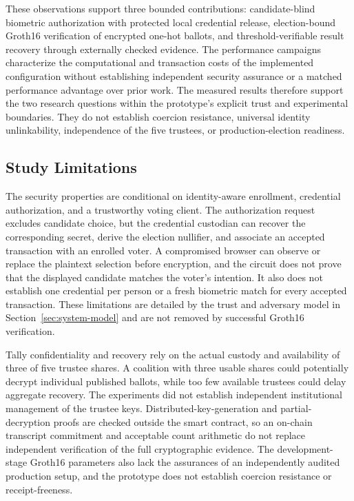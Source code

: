These observations support three bounded contributions: candidate-blind biometric authorization with protected local credential release, election-bound Groth16 verification of encrypted one-hot ballots, and threshold-verifiable result recovery through externally checked evidence. The performance campaigns characterize the computational and transaction costs of the implemented configuration without establishing independent security assurance or a matched performance advantage over prior work. The measured results therefore support the two research questions within the prototype's explicit trust and experimental boundaries. They do not establish coercion resistance, universal identity unlinkability, independence of the five trustees, or production-election readiness.

\subsection{Study Limitations}
\label{sec:09}
\label{sec:limitations}

The security properties are conditional on identity-aware enrollment, credential authorization, and a trustworthy voting client. The authorization request excludes candidate choice, but the credential custodian can recover the corresponding secret, derive the election nullifier, and associate an accepted transaction with an enrolled voter. A compromised browser can observe or replace the plaintext selection before encryption, and the circuit does not prove that the displayed candidate matches the voter's intention. It also does not establish one credential per person or a fresh biometric match for every accepted transaction. These limitations are detailed by the trust and adversary model in Section~\ref{sec:system-model} and are not removed by successful Groth16 verification.

Tally confidentiality and recovery rely on the actual custody and availability of three of five trustee shares. A coalition with three usable shares could potentially decrypt individual published ballots, while too few available trustees could delay aggregate recovery. The experiments did not establish independent institutional management of the trustee keys. Distributed-key-generation and partial-decryption proofs are checked outside the smart contract, so an on-chain transcript commitment and acceptable count arithmetic do not replace independent verification of the full cryptographic evidence. The development-stage Groth16 parameters also lack the assurances of an independently audited production setup, and the prototype does not establish coercion resistance or receipt-freeness.

